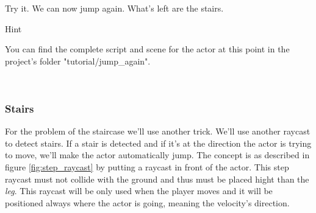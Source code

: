 \documentclass[10pt,a4paper]{article}
\newenvironment{hint}{%
\begin{bclogo}[logo=\bcinfo, couleurBarre=Green, noborder=true, 
               couleur=white]{Hint}
}{%
\end{bclogo}\hspace{1px}\\
}
\begin{document}
Try it. We can now jump again. What's left are the stairs.

\begin{hint}
You can find the complete script and scene for the actor at this point in the project's folder "tutorial/jump\_again".
\end{hint}

\subsubsection{Stairs}
For the problem of the staircase we'll use another trick. We'll use another raycast to detect stairs. If a stair is detected and if it's at the direction the actor is trying to move, we'll make the actor automatically jump. The concept is as described in figure \ref{fig:step_raycast} by putting a raycast in front of the actor. This step raycast must not collide with the ground and thus must be placed hight than the \textit{leg}. This raycast will be only used when the player moves and it will be positioned always where the actor is going, meaning the velocity's direction.
\end{document}
